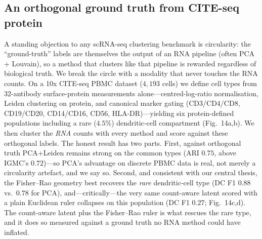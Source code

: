 \documentclass[11pt]{article}
\newcommand{\csari}{0.75}       %
\newcommand{\csmarkovari}{0.72} %
\newcommand{\csdcfr}{0.88}      %
\newcommand{\csdcpca}{0.78}     %
\newcommand{\csdceuc}{0.27}     %
\begin{document}
\subsection{An orthogonal ground truth from CITE-seq protein}
A standing objection to any scRNA-seq clustering benchmark is circularity: the ``ground-truth''
labels are themselves the output of an RNA pipeline (often PCA + Louvain), so a method that clusters
like that pipeline is rewarded regardless of biological truth. We break the circle with a modality
that never touches the RNA counts. On a 10x CITE-seq PBMC dataset ($4{,}193$ cells) we define cell
types from $32$-antibody surface-protein measurements alone---centred-log-ratio normalisation,
Leiden clustering on protein, and canonical marker gating (CD3/CD4/CD8, CD19/CD20, CD14/CD16,
CD56, HLA-DR)---yielding six protein-defined populations including a rare ($4.5\%$) dendritic-cell
compartment (Fig.~14a,b). We then cluster the \emph{RNA} counts with every method and score against
these orthogonal labels. The honest result has two parts. First, against orthogonal truth PCA+Leiden
remains strong on the common types (ARI $\csari$, above IGMC's $\csmarkovari$)---so PCA's advantage
on discrete PBMC data is real, not merely a circularity artefact, and we say so. Second, and
consistent with our central thesis, the Fisher--Rao geometry best recovers the \emph{rare}
dendritic-cell type (DC F1 $\csdcfr$ vs.\ $\csdcpca$ for PCA), and---critically---the very same
count-aware latent scored with a plain Euclidean ruler collapses on this population (DC F1 $\csdceuc$;
Fig.~14c,d). The count-aware latent plus the Fisher--Rao ruler is what rescues the rare type, and it
does so measured against a ground truth no RNA method could have inflated.
\end{document}

